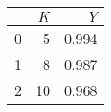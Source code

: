 \begin{tabular}{lrr}
\toprule
{} &  $K$ &    $Y$ \\
\midrule
0 &    5 &  0.994 \\
1 &    8 &  0.987 \\
2 &   10 &  0.968 \\
\bottomrule
\end{tabular}
